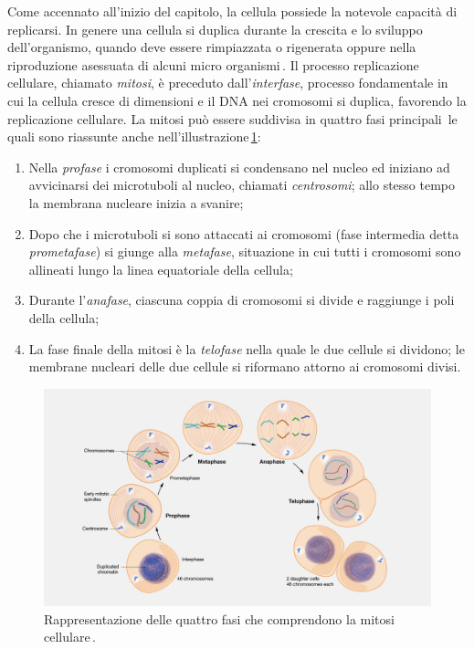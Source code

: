 Come accennato all'inizio del capitolo, la cellula possiede la notevole capacità di replicarsi. In genere una cellula si duplica durante la crescita e lo sviluppo dell'organismo, quando deve essere rimpiazzata o rigenerata oppure nella riproduzione asessuata di alcuni micro organismi\,\cite{bavle2014mitosis}. Il processo replicazione cellulare, chiamato \textsl{mitosi}, è preceduto dall'\textsl{interfase}, processo fondamentale in cui la cellula cresce di dimensioni e il DNA nei cromosomi si duplica, favorendo la replicazione cellulare. La mitosi può essere suddivisa in quattro fasi principali\,\cite{walczak2010mechanisms, bavle2014mitosis, li2020theoretical, sullivan2007finishing} le quali sono riassunte anche nell'illustrazione\,\ref{fig:mitosis}:
\begin{enumerate}
    \item Nella \textsl{profase} i cromosomi duplicati si condensano nel nucleo ed iniziano ad avvicinarsi dei microtuboli al nucleo, chiamati \textsl{centrosomi}; allo stesso tempo la membrana nucleare inizia a svanire;
    \item Dopo che i microtuboli si sono attaccati ai cromosomi (fase intermedia detta \textsl{prometafase}) si giunge alla \textsl{metafase}, situazione in cui tutti i cromosomi sono allineati lungo la linea equatoriale della cellula;
    \item Durante l'\textsl{anafase}, ciascuna coppia di cromosomi si divide e raggiunge i poli della cellula;
    \item La fase finale della mitosi è la \textsl{telofase} nella quale le due cellule si dividono; le membrane nucleari delle due cellule si riformano attorno ai cromosomi divisi.
\end{enumerate}

\begin{figure}[b!]
    \centering
    \includegraphics[width=\textwidth]{assets/mitosis.jpg}
    \caption[La mitosi cellulare.]{Rappresentazione delle quattro fasi che comprendono la mitosi cellulare\,\cite{nhgri_mitosis_image}.}\label{fig:mitosis}
\end{figure}

